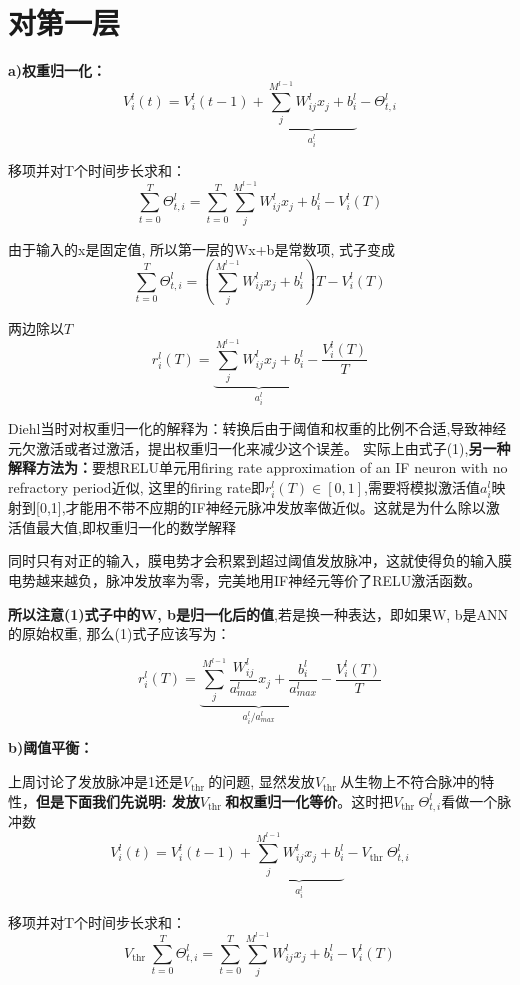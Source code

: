 \documentclass[a4paper,11pt,onecolumn,oneside,UTF8]{article}
\begin{document}
\section*{对第一层}
\textbf{a)权重归一化：}
$$V_i^l(t)=V_{i}^{l}(t-1)+\underbrace{\sum_j^{M^{l-1}}W_{ij}^lx_j+b_i^l}_{a_i^l}-\Theta_{t,i}^{l}$$

移项并对T个时间步长求和：
$$\sum_{t=0}^T\Theta_{t,i}^{l}=\sum_{t=0}^T \sum_j^{M^{l-1}}W_{ij}^lx_j+b_i^l - V_i^l(T)$$

由于输入的x是固定值, 所以第一层的Wx+b是常数项, 式子变成
$$\sum_{t=0}^T\Theta_{t,i}^{l}=\left(\sum_j^{M^{l-1}}W_{ij}^lx_j+b_i^l\right)T - V_i^l(T)$$

两边除以$T$
\begin{equation}
    r_i^l(T) = \underbrace{\sum_j^{M^{l-1}}W_{ij}^lx_j+b_i^l}_{a_i^l} - \frac{V_i^l(T)}{T}
\end{equation}

Diehl当时对权重归一化的解释为：转换后由于阈值和权重的比例不合适,导致神经元欠激活或者过激活，提出权重归一化来减少这个误差。
实际上由式子(1),\textbf{另一种解释方法为：}要想RELU单元用firing rate approximation of an IF neuron with no refractory period近似, 这里的firing rate即$r_i^l(T) \in [0, 1]$,需要将模拟激活值$a_i^l$映射到[0,1],才能用不带不应期的IF神经元脉冲发放率做近似。这就是为什么除以激活值最大值,即权重归一化的数学解释

同时只有对正的输入，膜电势才会积累到超过阈值发放脉冲，这就使得负的输入膜电势越来越负，脉冲发放率为零，完美地用IF神经元等价了RELU激活函数。

\textbf{所以注意(1)式子中的W, b是归一化后的值},若是换一种表达，即如果W, b是ANN的原始权重, 那么(1)式子应该写为：

\begin{equation}
    r_i^l(T) = \underbrace{\sum_j^{M^{l-1}}\frac{W_{ij}^l}{a_{max}^l}x_j+\frac{b_i^l}{a_{max}^l}}_{a_i^l/a_{max}^l} - \frac{V_i^l(T)}{T}
\end{equation}


\textbf{b)阈值平衡：}

上周讨论了发放脉冲是1还是$V_{\text {thr }}$的问题, 显然发放$V_{\text {thr }}$从生物上不符合脉冲的特性，\textbf{但是下面我们先说明: 发放$V_{\text {thr }}$和权重归一化等价}。这时把$V_{\text {thr }}\Theta_{t,i}^{l}$看做一个脉冲数
\begin{equation}
    V_i^l(t)=V_{i}^{l}(t-1)+\underbrace{\sum_j^{M^{l-1}}W_{ij}^lx_j+b_i^l}_{a_i^l}-V_{\text {thr }}\Theta_{t,i}^{l}
\end{equation}

移项并对T个时间步长求和：
$$V_{\text {thr }}\sum_{t=0}^T\Theta_{t,i}^{l}=\sum_{t=0}^T \sum_j^{M^{l-1}}W_{ij}^lx_j+b_i^l - V_i^l(T)$$
\end{document}
